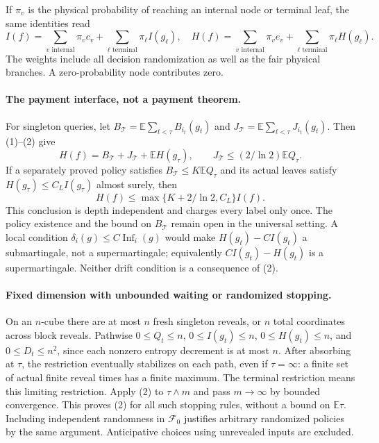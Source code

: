 \documentclass{article}
\begin{document}
If $\pi_v$ is the physical probability of reaching an internal node or
terminal leaf, the same identities read
\[
 I(f)=\sum_{v\text{ internal}}\pi_v c_v+
       \sum_{\ell\text{ terminal}}\pi_\ell I(g_\ell),\quad
 H(f)=\sum_{v\text{ internal}}\pi_v e_v+
       \sum_{\ell\text{ terminal}}\pi_\ell H(g_\ell).       \tag{3}
\]
The weights include all decision randomization as well as the fair
physical branches. A zero-probability node contributes zero.

\paragraph{The payment interface, not a payment theorem.}
For singleton queries, let
$B_{\mathcal T}=\mathbb E\sum_{t<\tau}B_{i_t}(g_t)$ and
$J_{\mathcal T}=\mathbb E\sum_{t<\tau}J_{i_t}(g_t)$.
Then (1)--(2) give
\[
 H(f)=B_{\mathcal T}+J_{\mathcal T}+\mathbb EH(g_\tau),
 \qquad J_{\mathcal T}\le(2/\ln2)\mathbb E Q_\tau.
\]
If a separately proved policy satisfies
$B_{\mathcal T}\le K\mathbb E Q_\tau$ and its actual leaves satisfy
$H(g_\tau)\le C_L I(g_\tau)$ almost surely, then
\[
 H(f)\le \max\{K+2/\ln2,C_L\}I(f).                       \tag{4}
\]
This conclusion is depth independent and charges every label only once.
The policy existence and the bound on $B_{\mathcal T}$ remain open in
the universal setting. A local condition
$\delta_i(g)\le C\operatorname{Inf}_i(g)$ would make
$H(g_t)-C I(g_t)$ a submartingale, not a supermartingale;
equivalently $C I(g_t)-H(g_t)$ is a supermartingale. Neither drift
condition is a consequence of (2).

\paragraph{Fixed dimension with unbounded waiting or randomized stopping.}
On an $n$-cube there are at most $n$ fresh singleton reveals, or $n$ total
coordinates across block reveals. Pathwise $0\le Q_t\le n$,
$0\le I(g_t)\le n$, $0\le H(g_t)\le n$, and
$0\le D_t\le n^2$, since each nonzero entropy decrement is at most $n$.
After absorbing at $\tau$, the restriction eventually stabilizes on each
path, even if $\tau=\infty$: a finite set of actual finite reveal times
has a finite maximum. The terminal restriction means this limiting
restriction. Apply (2) to $\tau\wedge m$ and pass $m\to\infty$ by
bounded convergence. This proves (2) for all such stopping rules,
without a bound on $\mathbb E\tau$. Including independent randomness
in $\mathcal F_0$ justifies arbitrary randomized policies by the same
argument. Anticipative choices using unrevealed inputs are excluded.
\end{document}
